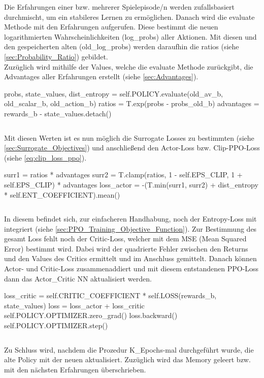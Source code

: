 Die Erfahrungen einer bzw. mehrerer Spielepisode/n werden zufallsbasiert durchmischt, um ein stabileres Lernen zu ermöglichen. 
Danach wird die evaluate Methode mit den Erfahrungen aufgerufen. Diese bestimmt die neuen logarithmierten Wahrscheinlichkeiten (log\_probs) aller Aktionen. Mit diesen und den gespeicherten alten (old\_log\_probs) werden daraufhin die ratios (siehe \ref{sec:Probability_Ratio}) gebildet.\\
Zuzüglich wird mithilfe der Values, welche die evaluate Methode zurückgibt, die Advantages aller Erfahrungen erstellt (siehe \ref{sec:Advantages}).
\begin{python}		
probs, state_values, dist_entropy = self.POLICY.evaluate(old_av_b, old_scalar_b, old_action_b)	
ratios = T.exp(probs - probs_old_b)	
advantages = rewards_b - state_values.detach()
\end{python}
\begin{lstlisting}[caption=Bestimmung der Ratios und Advantages, label=code:Bestimmung_Ratio_Advantages]
\end{lstlisting}
Mit diesen Werten ist es nun möglich die Surrogate Losses zu bestimmten (siehe \ref{sec:Surrogate_Objectives}) und anschließend den Actor-Loss bzw. Clip-PPO-Loss (siehe \ref{eq:clip_loss_ppo}).
\begin{python}
	surr1 = ratios * advantages
	surr2 = T.clamp(ratios, 1 - self.EPS_CLIP, 1 + self.EPS_CLIP) * advantages
	loss_actor = -(T.min(surr1, surr2) + dist_entropy * self.ENT_COEFFICIENT).mean()
\end{python}
\begin{lstlisting}[caption=Bestimmung der Surrogate Losses, label=code:Bestimmung_Surrogate_Losses]
\end{lstlisting}
In diesem befindet sich, zur einfacheren Handhabung, noch der Entropy-Loss mit integriert (siehe \ref{sec:PPO_Training_Objective_Function}).
Zur Bestimmung des gesamt Loss fehlt noch der Critic-Loss, welcher mit dem MSE (Mean Squared Error) bestimmt wird. Dabei wird der quadrierte Fehler zwischen den Returns und den Values des Critics ermittelt und im Anschluss gemittelt.
Danach können Actor- und Critic-Loss zusammenaddiert und mit diesem entstandenen PPO-Loss dann das Actor\_Critic NN aktualisiert werden.
\begin{python}
loss_critic = self.CRITIC_COEFFICIENT * self.LOSS(rewards_b, state_values)
loss = loss_actor + loss_critic 
self.POLICY.OPTIMIZER.zero_grad()
loss.backward()
self.POLICY.OPTIMIZER.step()
\end{python}
\begin{lstlisting}[caption=Bestimmung des PPO-Losses \& Update der Netze, label=code:Bestimmung_PPO_Losses_update_NN]
\end{lstlisting}
Zu Schluss wird, nachdem die Prozedur K\_Epochs-mal durchgeführt wurde, die alte Policy mit der neuen aktualisiert. Zuzüglich wird das Memory geleert bzw. mit den nächsten Erfahrungen überschrieben.

